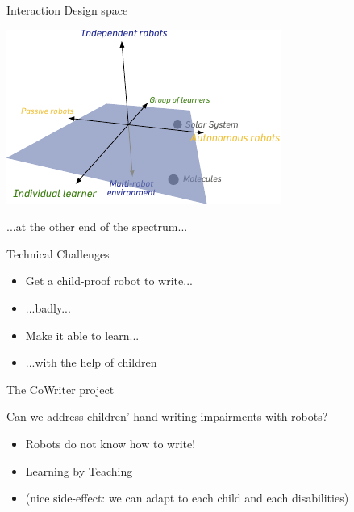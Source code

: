 \documentclass[compress]{beamer}
\begin{document}
{
 \begin{frame}{Interaction Design space}
     \begin{center}
         \includegraphics[width=0.8\linewidth]{cellulo/interaction-space}
     \end{center}
 \end{frame}
 }


 \begin{frame}[plain]{}
     ...at the other end of the spectrum...
 \end{frame}


\begin{frame}[label=cowriter-impl]{Technical Challenges}
    \begin{itemize}
        \item<1-> Get a child-proof robot to write...
        \item<2-> ...badly...
        \item<3-> Make it able to learn...
        \item<4-> ...with the help of children
    \end{itemize}
\end{frame}

{

\begin{frame}{The CoWriter project}

    Can we address children' hand-writing impairments with robots?

    \begin{itemize}
        \item<2-> Robots do not know how to write!
        \item<3-> Learning by Teaching
        \item<4-> (nice side-effect: we can adapt to each child and each disabilities)
    \end{itemize}
\end{frame}
}
\end{document}
